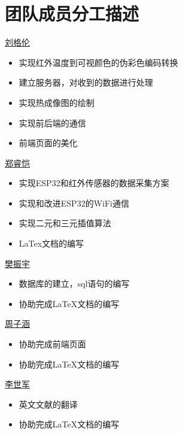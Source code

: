 \chapter{团队成员分工描述}

\underline{刘格伦}
\begin{itemize}
    \item 实现红外温度到可视颜色的伪彩色编码转换
    \item 建立服务器，对收到的数据进行处理
    \item 实现热成像图的绘制
    \item 实现前后端的通信
    \item 前端页面的美化
    \end{itemize}

\underline{郑睿恺}
\begin{itemize}
    \item 实现ESP32和红外传感器的数据采集方案
    \item 实现和改进ESP32的WiFi通信
    \item 实现二元和三元插值算法
    \item LaTex文档的编写
    \end{itemize}

\underline{樊振宇}
\begin{itemize}
    \item 数据库的建立，sql语句的编写
    \item 协助完成LaTeX文档的编写
    \end{itemize}
    
    \underline{周子涵}
\begin{itemize}
    \item 协助完成前端页面
    \item 协助完成LaTeX文档的编写
    \end{itemize}
    
    \underline{李世军}
\begin{itemize}
    \item 英文文献的翻译
    \item 协助完成LaTeX文档的编写
    \end{itemize}








